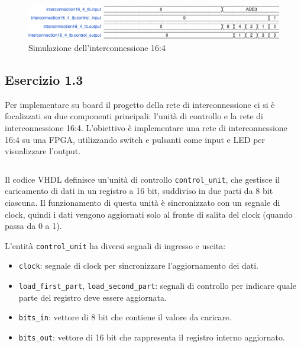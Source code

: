 \begin{figure}[h]
    \centering
    \includegraphics[width=\textwidth]{img/interconnection16_4_tb.pdf}
    \caption{Simulazione dell'interconnessione 16:4}
    \label{fig:interconnection16_4_tb}
\end{figure}

\subsection{Esercizio 1.3}
Per implementare su board il progetto della rete di interconnessione ci si è focalizzati su due componenti principali: l’unità di controllo e la rete di interconnessione 16:4. L'obiettivo è implementare una rete di interconnessione 16:4 su una FPGA, utilizzando switch e pulsanti come input e LED per visualizzare l'output.

\begin{code}
    \inputminted{vhdl}{vhdl/interconnection16_4_control_unit.vhd}
    \caption{Implementazione dell'unità di controllo}
    \label{cod:interconnection16_4_control_unit}
\end{code}

Il codice VHDL definisce un'unità di controllo \texttt{control\_unit}, che gestisce il caricamento di dati in un registro a 16 bit, suddiviso in due parti da 8 bit ciascuna. Il funzionamento di questa unità è sincronizzato con un segnale di clock, quindi i dati vengono aggiornati solo al fronte di salita del clock (quando passa da 0 a 1).

L’entità \texttt{control\_unit} ha diversi segnali di ingresso e uscita:

\begin{itemize}
    \item \texttt{clock}: segnale di clock per sincronizzare l'aggiornamento dei dati.
    \item \texttt{load\_first\_part}, \texttt{load\_second\_part}: segnali di controllo per indicare quale parte del registro deve essere aggiornata.
    \item \texttt{bits\_in}: vettore di 8 bit che contiene il valore da caricare.
    \item \texttt{bits\_out}: vettore di 16 bit che rappresenta il registro interno aggiornato.
\end{itemize}

